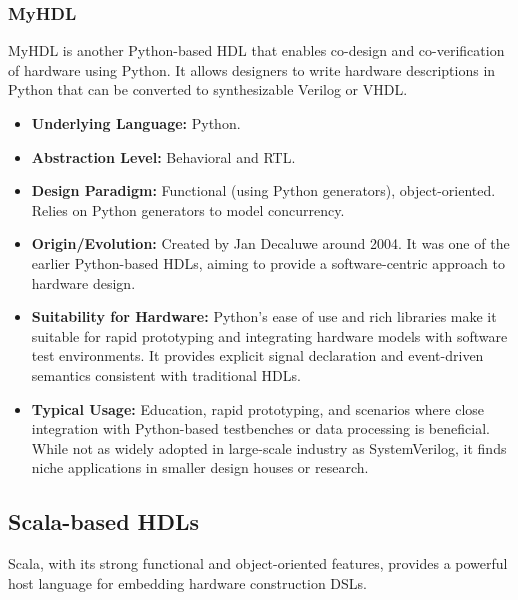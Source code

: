 \documentclass[sigconf, anonymous=false]{acmart} %
\begin{document}
\subsubsection{MyHDL}
MyHDL is another Python-based HDL that enables co-design and co-verification of hardware using Python. It allows designers to write hardware descriptions in Python that can be converted to synthesizable Verilog or VHDL.
\begin{itemize}
    \item \textbf{Underlying Language:} Python.
    \item \textbf{Abstraction Level:} Behavioral and RTL.
    \item \textbf{Design Paradigm:} Functional (using Python generators), object-oriented. Relies on Python generators to model concurrency.
    \item \textbf{Origin/Evolution:} Created by Jan Decaluwe around 2004. It was one of the earlier Python-based HDLs, aiming to provide a software-centric approach to hardware design.
    \item \textbf{Suitability for Hardware:} Python's ease of use and rich libraries make it suitable for rapid prototyping and integrating hardware models with software test environments. It provides explicit signal declaration and event-driven semantics consistent with traditional HDLs.
    \item \textbf{Typical Usage:} Education, rapid prototyping, and scenarios where close integration with Python-based testbenches or data processing is beneficial. While not as widely adopted in large-scale industry as SystemVerilog, it finds niche applications in smaller design houses or research.
\end{itemize}

\subsection{Scala-based HDLs}
Scala, with its strong functional and object-oriented features, provides a powerful host language for embedding hardware construction DSLs.
\end{document}
